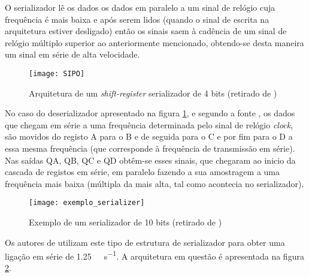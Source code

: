 O serializador lê os dados os dados em paralelo a um sinal de relógio cuja frequência é mais baixa e após serem lidos (quando o sinal de escrita na arquitetura estiver desligado) então os sinais saem à cadência de um sinal de relógio múltiplo superior ao anteriormente mencionado, obtendo-se desta maneira um sinal em série de alta velocidade.

	\begin{figure}[h!]
	\begin{center}
		\leavevmode
		\texttt{[image: SIPO]}
		\caption[Arquitetura de um \textit{shift-register} deserializador de 4 bits]{Arquitetura de um \textit{shift-register} serializador de 4 bits (retirado de \cite{R034})}
		\label{fig:sipo}
	\end{center}
\end{figure}


No caso do deserializador apresentado na figura \ref{fig:sipo}, e segundo a fonte \cite{R034}, os dados que chegam em série a uma frequência determinada pelo sinal de relógio \textit{clock}, são movidos do registo A para o B e de seguida para o C e por fim para o D a essa mesma frequência (que corresponde à frequência de transmissão em série). Nas saídas QA, QB, QC e QD obtêm-se esses sinais, que chegaram ao inicio da cascada de registos em série, em paralelo fazendo a sua amostragem a uma frequência mais baixa (múltipla da mais alta, tal como acontecia no serializador).

\begin{figure}[h!]
	\begin{center}
		\leavevmode
		\texttt{[image: exemplo\_serializer]}
		\caption[Exemplo de um serializador de 10 bits]{Exemplo de um serializador de 10 bits (retirado de \cite{R033})}
		\label{fig:exemplo_de_33}
	\end{center}
\end{figure}

Os autores de \cite{R033} utilizam este tipo de estrutura de serializador para obter uma ligação em série de \SI{1.25}{\giga\bit\per\second}. A arquitetura em questão é apresentada na figura \ref{fig:exemplo_de_33}.

